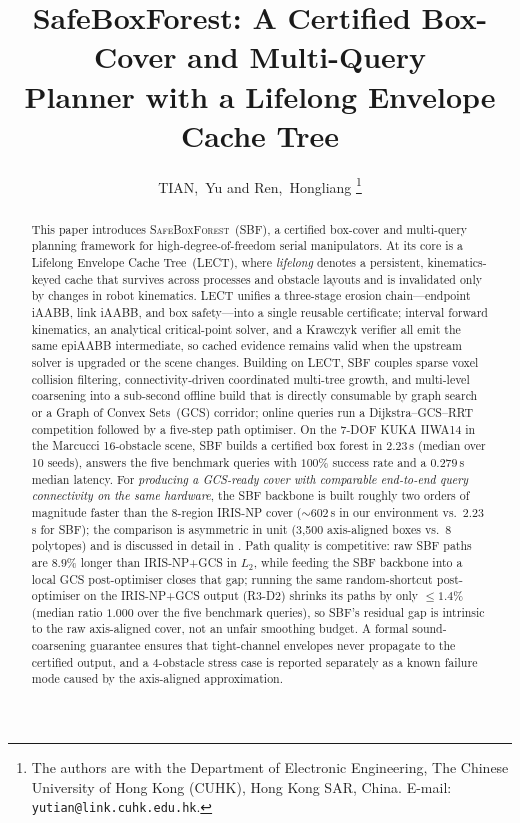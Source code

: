 \documentclass[journal]{IEEEtran}
\begin{document}
\title{SafeBoxForest: A Certified Box-Cover and Multi-Query\\
Planner with a Lifelong Envelope Cache Tree}

\author{TIAN,~Yu and Ren,~Hongliang%
\thanks{The authors are with the Department of Electronic Engineering,
The Chinese University of Hong Kong (CUHK), Hong Kong SAR, China.
E-mail: \texttt{yutian@link.cuhk.edu.hk}.}}

\maketitle

\begin{abstract}
This paper introduces \textsc{SafeBoxForest}~(SBF), a certified
box-cover and multi-query planning framework for high-degree-of-freedom
serial manipulators.
At its core is a Lifelong Envelope Cache Tree~(LECT), where
\emph{lifelong} denotes a persistent, kinematics-keyed cache that
survives across processes and obstacle layouts and is invalidated only
by changes in robot kinematics.
LECT unifies a three-stage erosion chain---endpoint iAABB,
link iAABB, and box safety---into a single reusable certificate;
interval forward kinematics, an analytical critical-point solver, and a
Krawczyk verifier all emit the same epiAABB intermediate, so cached
evidence remains valid when the upstream solver is upgraded or the
scene changes.
Building on LECT, SBF couples sparse voxel collision filtering,
connectivity-driven coordinated multi-tree growth, and multi-level
coarsening into a sub-second offline build that is directly consumable
by graph search or a Graph of Convex Sets~(GCS) corridor; online
queries run a Dijkstra--GCS--RRT competition followed by a five-step
path optimiser.
On the 7-DOF KUKA IIWA14 in the Marcucci 16-obstacle scene, SBF builds
a certified box forest in $2.23$\,s (median over 10 seeds), answers
the five benchmark queries with $100\%$ success rate and a $0.279$\,s
median latency. For \emph{producing a GCS-ready cover with comparable
end-to-end query connectivity on the same hardware}, the SBF backbone
is built roughly two orders of magnitude faster than the 8-region
IRIS-NP cover (${\sim}602$\,s in our environment vs.\ $2.23$\,s for
SBF); the comparison is asymmetric in unit (3{,}500 axis-aligned
boxes vs.\ 8 polytopes) and is discussed in detail in
. Path quality is competitive: raw SBF paths are
$8.9\%$ longer than IRIS-NP+GCS in $L_2$, while feeding the SBF
backbone into a local GCS post-optimiser closes that gap; running the
same random-shortcut post-optimiser on the IRIS-NP+GCS output (R3-D2)
shrinks its paths by only $\le 1.4\%$ (median ratio $1.000$ over the
five benchmark queries), so SBF's residual gap is intrinsic to the
raw axis-aligned cover, not an unfair smoothing budget. A formal
sound-coarsening guarantee ensures that tight-channel envelopes
never propagate to the certified output, and a $4$-obstacle stress
case is reported separately as a known failure mode caused by the
axis-aligned approximation.
\end{abstract}
\end{document}
